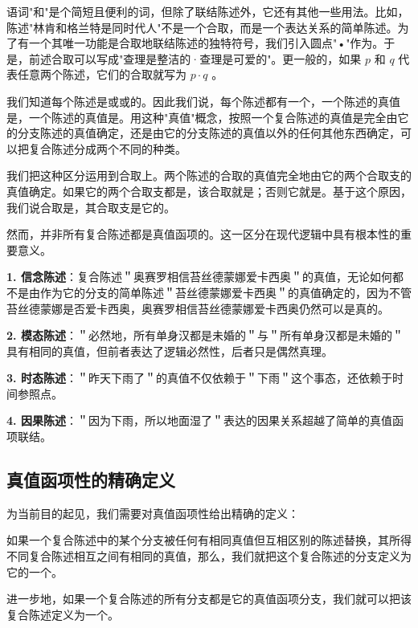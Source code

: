 语词"和"是个简短且便利的词，但除了联结陈述外，它还有其他一些用法。比如，陈述"林肯和格兰特是同时代人"不是一个合取，而是一个表达关系的简单陈述。为了有一个其唯一功能是合取地联结陈述的独特符号，我们引入圆点"•"作为。于是，前述合取可以写成"查理是整洁的·查理是可爱的"。更一般的，如果 $p$ 和 $q$ 代表任意两个陈述，它们的合取就写为 $p \cdot q$ 。

我们知道每个陈述是或或的。因此我们说，每个陈述都有一个，一个陈述的真值是，一个陈述的真值是。用这种"真值"概念，按照一个复合陈述的真值是完全由它的分支陈述的真值确定，还是由它的分支陈述的真值以外的任何其他东西确定，可以把复合陈述分成两个不同的种类。

\begin{theorembox}[title=真值函项复合陈述]
我们把这种区分运用到合取上。两个陈述的合取的真值完全地由它的两个合取支的真值确定。如果它的两个合取支都是，该合取就是；否则它就是。基于这个原因，我们说合取是，其合取支是它的。
\end{theorembox}

然而，并非所有复合陈述都是真值函项的。这一区分在现代逻辑中具有根本性的重要意义。

\begin{examplebox}[title=非真值函项复合陈述的典型例子]
\textbf{1. 信念陈述}：复合陈述＂奥赛罗相信苔丝德蒙娜爱卡西奥＂的真值，无论如何都不是由作为它的分支的简单陈述＂苔丝德蒙娜爱卡西奥＂的真值确定的，因为不管苔丝德蒙娜是否爱卡西奥，奥赛罗相信苔丝德蒙娜爱卡西奥仍然可以是真的。

\textbf{2. 模态陈述}：＂必然地，所有单身汉都是未婚的＂与＂所有单身汉都是未婚的＂具有相同的真值，但前者表达了逻辑必然性，后者只是偶然真理。

\textbf{3. 时态陈述}：＂昨天下雨了＂的真值不仅依赖于＂下雨＂这个事态，还依赖于时间参照点。

\textbf{4. 因果陈述}：＂因为下雨，所以地面湿了＂表达的因果关系超越了简单的真值函项联结。
\end{examplebox}

\subsection{真值函项性的精确定义}

为当前目的起见，我们需要对真值函项性给出精确的定义：

\begin{theorembox}[title=真值函项分支的定义]
如果一个复合陈述中的某个分支被任何有相同真值但互相区别的陈述替换，其所得不同复合陈述相互之间有相同的真值，那么，我们就把这个复合陈述的分支定义为它的一个。

进一步地，如果一个复合陈述的所有分支都是它的真值函项分支，我们就可以把该复合陈述定义为一个。\cite{church1956}
\end{theorembox}

